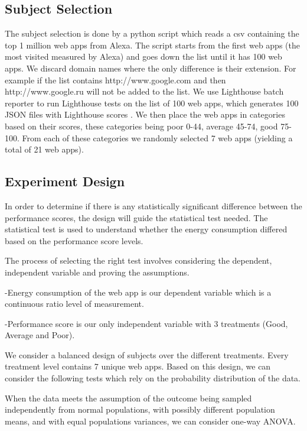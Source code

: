 \subsection{Subject Selection}
	
	The subject selection is done by a python script \cite{WEBSITE:11} which reads a csv containing the top 1 million web apps from Alexa. The script starts from the first web apps (the most visited measured by Alexa) and goes down the list until it has 100 web apps. We discard domain names where the only difference is their extension. For example if the list contains http://www.google.com and then http://www.google.ru will not be added to the list.
We use Lighthouse batch reporter to run Lighthouse tests on the list of 100 web apps, which generates 100 JSON files with Lighthouse scores \cite{WEBSITE:12}. 
We then place the web apps in categories based on their scores, these categories being poor 0-44, average 45-74, good 75-100. From each of these categories we randomly selected 7 web apps (yielding a total of 21 web apps). \newline
	
\subsection{Experiment Design}


In order to determine if there is any statistically significant
difference between the performance scores, the design will guide the statistical test needed. The statistical test is used to understand whether the energy consumption differed based on the performance score levels.

The process of selecting the right test involves considering the dependent, independent variable and proving the assumptions. 

-Energy consumption of the web app is our dependent variable which is a continuous ratio level of measurement.

-Performance score is our only independent variable with 3 treatments (Good, Average and Poor). \newline

We consider a balanced design of subjects over the different treatments. Every treatment level contains 7 unique web apps. Based on this design, we can consider the following tests which rely on the probability distribution of the data.


When the data meets the assumption of the outcome being sampled independently from normal populations, with possibly different population means, and with equal populations variances, we can consider one-way ANOVA. 

